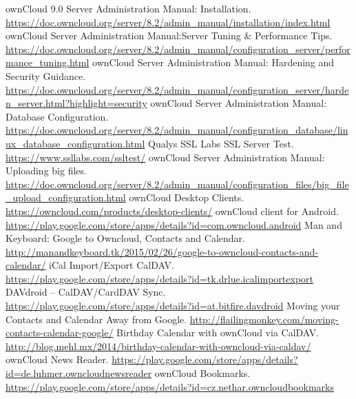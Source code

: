 \documentclass[10pt, a5paper]{article}
\begin{document}
\begin{thebibliography}{99}
 ownCloud 9.0 Server Administration Manual: Installation. \url{https://doc.owncloud.org/server/8.2/admin_manual/installation/index.html}
 ownCloud Server Administration Manual:Server Tuning \& Performance Tips. \url{https://doc.owncloud.org/server/8.2/admin_manual/configuration_server/performance_tuning.html}
 ownCloud Server Administration Manual: Hardening and Security Guidance. \url{https://doc.owncloud.org/server/8.2/admin_manual/configuration_server/harden_server.html?highlight=security}
 ownCloud Server Administration Manual: Database Configuration. \url{https://doc.owncloud.org/server/8.2/admin_manual/configuration_database/linux_database_configuration.html}
 Qualys SSL Labs SSL Server Test. \url{https://www.ssllabs.com/ssltest/}
 ownCloud Server Administration Manual: Uploading big files. \url{https://doc.owncloud.org/server/8.2/admin_manual/configuration_files/big_file_upload_configuration.html}
 ownCloud Desktop Clients. \url{https://owncloud.com/products/desktop-clients/}
 ownCloud client for Android. \url{https://play.google.com/store/apps/details?id=com.owncloud.android}
 Man and Keyboard: Google to Owncloud, Contacts and Calendar. \url{http://manandkeyboard.tk/2015/02/26/google-to-owncloud-contacts-and-calendar/}
 iCal Import/Export CalDAV. \url{https://play.google.com/store/apps/details?id=tk.drlue.icalimportexport}
 DAVdroid – CalDAV/CardDAV Sync. \url{https://play.google.com/store/apps/details?id=at.bitfire.davdroid}
 Moving your Contacts and Calendar Away from Google. \url{http://flailingmonkey.com/moving-contacts-calendar-google/}
 Birthday Calendar with ownCloud via CalDAV. \url{http://blog.mehl.mx/2014/birthday-calendar-with-owncloud-via-caldav/}
 ownCloud News Reader. \url{https://play.google.com/store/apps/details?id=de.luhmer.owncloudnewsreader}
 ownCloud Bookmarks. \url{https://play.google.com/store/apps/details?id=cz.nethar.owncloudbookmarks}
\end{thebibliography}
\end{document}
